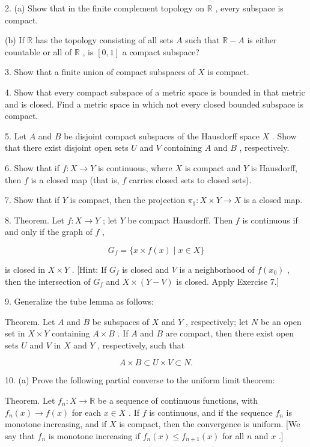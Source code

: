 2. (a) Show that in the finite complement topology on \(\mathbb{R}\) , every subspace is compact.

(b) If \(\mathbb{R}\) has the topology consisting of all sets \(A\) such that \(\mathbb{R} - A\) is either countable or all of \(\mathbb{R}\) , is \(\left\lbrack  {0,1}\right\rbrack\) a compact subspace?

3. Show that a finite union of compact subspaces of \(X\) is compact.

4. Show that every compact subspace of a metric space is bounded in that metric and is closed. Find a metric space in which not every closed bounded subspace is compact.

5. Let \(A\) and \(B\) be disjoint compact subspaces of the Hausdorff space \(X\) . Show that there exist disjoint open sets \(U\) and \(V\) containing \(A\) and \(B\) , respectively.

6. Show that if \(f : X \rightarrow  Y\) is continuous, where \(X\) is compact and \(Y\) is Hausdorff, then \(f\) is a closed map (that is, \(f\) carries closed sets to closed sets).

7. Show that if \(Y\) is compact, then the projection \({\pi }_{1} : X \times  Y \rightarrow  X\) is a closed map.

8. Theorem. Let \(f : X \rightarrow  Y\) ; let \(Y\) be compact Hausdorff. Then \(f\) is continuous if and only if the graph of \(f\) ,

\[
{G}_{f} = \{ x \times  f\left( x\right)  \mid  x \in  X\}
\]

is closed in \(X \times  Y\) . [Hint: If \({G}_{f}\) is closed and \(V\) is a neighborhood of \(f\left( {x}_{0}\right)\) , then the intersection of \({G}_{f}\) and \(X \times  \left( {Y - V}\right)\) is closed. Apply Exercise 7.]

9. Generalize the tube lemma as follows:

Theorem. Let \(A\) and \(B\) be subspaces of \(X\) and \(Y\) , respectively; let \(N\) be an open set in \(X \times  Y\) containing \(A \times  B\) . If \(A\) and \(B\) are compact, then there exist open sets \(U\) and \(V\) in \(X\) and \(Y\) , respectively, such that

\[
A \times  B \subset  U \times  V \subset  N.
\]

10. (a) Prove the following partial converse to the uniform limit theorem:

Theorem. Let \({f}_{n} : X \rightarrow  \mathbb{R}\) be a sequence of continuous functions, with \({f}_{n}\left( x\right)  \rightarrow  f\left( x\right)\) for each \(x \in  X\) . If \(f\) is continuous, and if the sequence \({f}_{n}\) is monotone increasing, and if \(X\) is compact, then the convergence is uniform. [We say that \({f}_{n}\) is monotone increasing if \({f}_{n}\left( x\right)  \leq  {f}_{n + 1}\left( x\right)\) for all \(n\) and \(x\) .]

